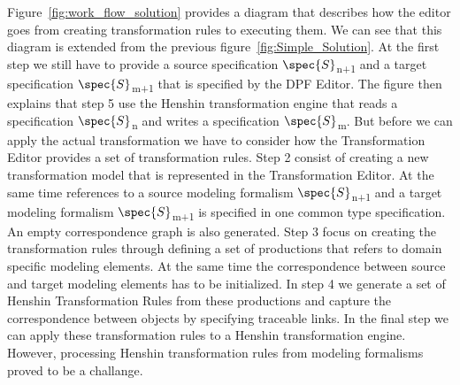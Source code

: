 Figure~\ref{fig:work_flow_solution} provides a diagram that describes how the
editor goes from creating transformation rules to executing them. We can see
that this diagram is extended from the previous
figure~\ref{fig:Simple_Solution}. At the first step we still have to provide a
source specification $\spec{S}$\textsubscript{n+1} and a target specification
$\spec{S}$\textsubscript{m+1} that is specified by the DPF Editor. The figure
then explains that step 5 use the Henshin transformation engine that reads a
specification $\spec{S}$\textsubscript{n} and writes a specification
$\spec{S}$\textsubscript{m}. But before we can apply the actual transformation
we have to consider how the Transformation Editor provides a set of
transformation rules. Step 2 consist of creating a new transformation model that
is represented in the Transformation Editor. At the same time references to a
source modeling formalism $\spec{S}$\textsubscript{n+1} and a target modeling
formalism $\spec{S}$\textsubscript{m+1} is specified in one common type
specification. An empty correspondence graph is also generated. Step 3 focus
on creating the transformation rules through defining a set of productions that
refers to domain specific modeling elements. At the same time the correspondence
between source and target modeling elements has to be initialized. In step 4 we
generate a set of Henshin Transformation Rules from these productions and
capture the correspondence between objects by specifying traceable links. In the
final step we can apply these transformation rules to a Henshin transformation
engine. However, processing Henshin transformation rules from modeling
formalisms proved to be a challange. 

